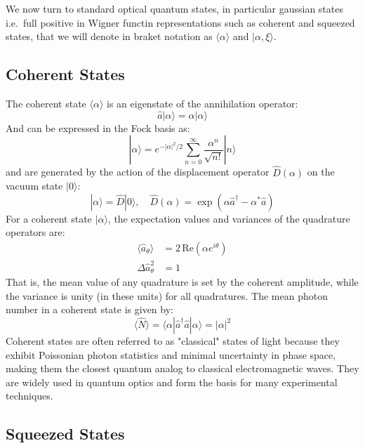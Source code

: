 We now turn to standard optical quantum states, in particular gaussian states i.e.\ full positive in Wigner functin representations such as coherent and squeezed states, that we will denote in braket notation as $\langle\alpha\rangle$ and $|\alpha, \xi\rangle $.

\subsection*{Coherent States}
The coherent state $\langle\alpha\rangle$ is an eigenstate of the annihilation operator:
\begin{equation}
\hat{a}|\alpha\rangle = \alpha|\alpha\rangle
\end{equation}
And can be expressed in the Fock basis as: 
\begin{equation}
|\alpha\rangle = e^{-|\alpha|^2/2} \sum_{n=0}^{\infty} \frac{\alpha^n}{\sqrt{n!}} |n\rangle
\end{equation}
and are generated by the action of the displacement operator $\hat{D}(\alpha)$ on the vacuum state $|0\rangle$:
\begin{equation}
|\alpha\rangle = \hat{D}|0\rangle, \quad \hat{D}(\alpha) = \exp(\alpha \hat{a}^\dagger - \alpha^* \hat{a})
\end{equation}
For a coherent state $|\alpha\rangle$, the expectation values and variances of the quadrature operators are:
\begin{equation}
\begin{aligned}
  \langle \hat{a}_\theta \rangle &= 2\,\mathrm{Re}(\alpha e^{i\theta}) \\
  \Delta \hat{a}_\theta^2 &= 1
\end{aligned}
\end{equation}
That is, the mean value of any quadrature is set by the coherent amplitude, while the variance is unity (in these units) for all quadratures. The mean photon number in a coherent state is given by: 
\begin{equation}
\langle \hat{N} \rangle = \langle \alpha | \hat{a}^\dagger \hat{a} | \alpha \rangle = |\alpha|^2
\end{equation}
Coherent states are often referred to as "classical" states of light because they exhibit Poissonian photon statistics and minimal uncertainty in phase space, making them the closest quantum analog to classical electromagnetic waves. They are widely used in quantum optics and form the basis for many experimental techniques.
\subsection*{Squeezed States}

